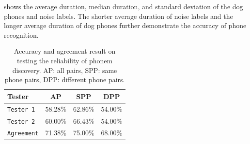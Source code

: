  shows the average duration, median duration, and standard deviation of the dog phones and noise labels. The shorter average duration of noise labels and the longer average duration of dog phones further demonstrate the accuracy of phone recognition.

\begin{table}[th]
\centering
\small
\begin{tabular}{lccc}
\hline
\textbf{Tester} & \textbf{AP} & \textbf{SPP} & \textbf{DPP}\\
\hline
\verb|Tester 1| & 58.28\% & 62.86\% & 54.00\%\\
\verb|Tester 2| & 60.00\% & 66.43\% & 54.00\%\\
\verb|Agreement| & 71.38\% & 75.00\% & 68.00\% \\\hline
\end{tabular}
\caption{Accuracy and agreement result on testing the reliability of phonem discovery. AP: all pairs, SPP: same phone pairs, DPP: different phone pairs.}
\label{tab:phonetestresult}
\end{table}







